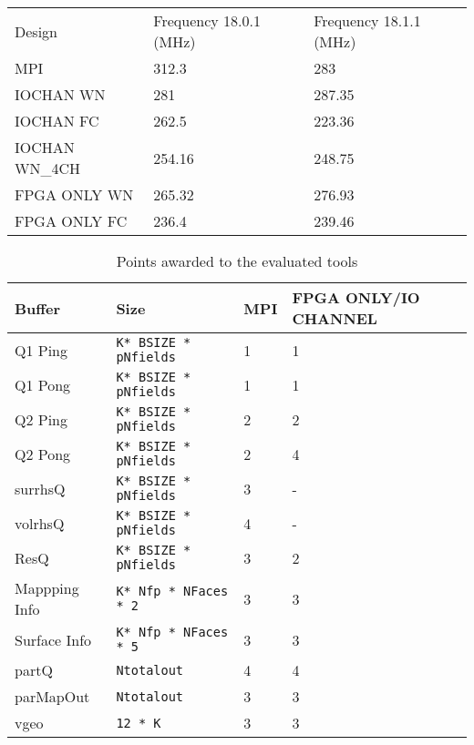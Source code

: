 \begin{table}[]
\begin{tabular}{lll}
Design         & Frequency 18.0.1 (MHz) & Frequency 18.1.1 (MHz) \\
MPI            & 312.3                  & 283                    \\
IOCHAN WN      & 281                    & 287.35                 \\
IOCHAN FC      & 262.5                  & 223.36                 \\
IOCHAN WN\_4CH & 254.16                 & 248.75                 \\
FPGA ONLY WN   & 265.32                 & 276.93                 \\
FPGA ONLY FC   & 236.4                  & 239.46
\end{tabular}
\end{table}

\begin{table}[h]
    \begin{center}
        \caption{Points awarded to the evaluated tools}
        \label{tab:channel_assign}
        \begin{tabular}{|l|l|C{3cm}|C{3.4cm}|} %
          \hline
          \textbf{Buffer} & \textbf{Size} & \textbf{MPI} & \textbf{FPGA ONLY/IO CHANNEL}\\
          \hline
          Q1 Ping & \texttt{K* BSIZE * pNfields}  & 1 & 1 \\
          \hline
          Q1 Pong & \texttt{K* BSIZE * pNfields} & 1 & 1 \\
          Q2 Ping & \texttt{K* BSIZE * pNfields}  & 2 & 2 \\
          \hline
          Q2 Pong & \texttt{K* BSIZE * pNfields}  & 2 & 4 \\
          \hline
          surrhsQ & \texttt{K* BSIZE * pNfields}  & 3 & - \\
          \hline
          volrhsQ & \texttt{K* BSIZE * pNfields}  & 4 & - \\
          \hline
          ResQ & \texttt{K* BSIZE * pNfields}  & 3 & 2 \\
          \hline
          Mappping Info & \texttt{K* Nfp * NFaces * 2}  & 3 & 3 \\
          \hline
          Surface Info & \texttt{K* Nfp * NFaces * 5} & 3 & 3 \\
          \hline
          partQ & \texttt{Ntotalout} & 4 & 4 \\
          \hline
          parMapOut & \texttt{Ntotalout}  & 3 & 3 \\
          \hline
          vgeo & \texttt{12 * K}  & 3 & 3 \\
          \hline

        \end{tabular}
    \end{center}
 \end{table}


